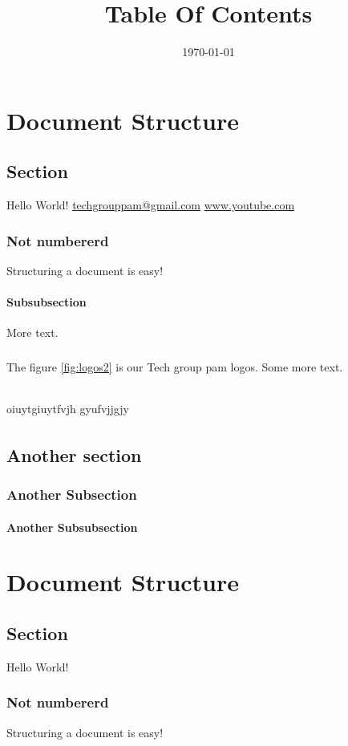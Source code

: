 \documentclass{book}
\title{Table Of Contents}
\date{\today}
\begin{document}
	\maketitle
	\tableofcontents

	\listoffigures
	
	\listoftables
\chapter{Document Structure}
	\section{Section}
	Hello World!
\href{mailto:techgrouppam@gmail.com}{techgrouppam@gmail.com}
\url{www.youtube.com}
	\subsection*{Not numbererd}
	Structuring a document is easy!
	\subsubsection{Subsubsection}
	More text.
	\paragraph{}
	 The figure \ref{fig:logos2} is our Tech group pam logos. 
	Some more text.
	\subparagraph{}
	oiuytgiuytfvjh gyufvjjgjy
	
	\subparagraph{}
	\lipsum[1]
	\section{Another section}
	\subsection{Another Subsection}
	\subsubsection{Another Subsubsection}
	\lipsum[1-3]
\chapter{Document Structure}
	\section{Section}
	Hello World!
	\subsection*{Not numbererd}
	Structuring a document is easy!
\end{document}
